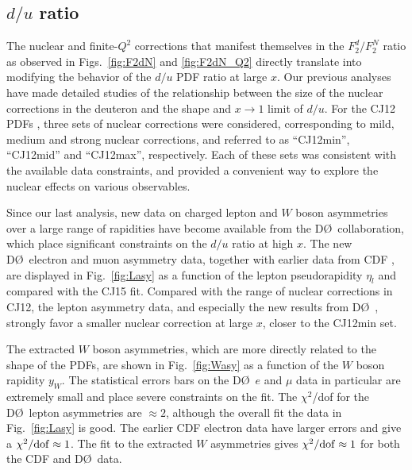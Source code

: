 \documentclass[aps,prd,amsmath,preprint]{revtex4}
\begin{document}
\subsection{$d/u$ ratio}
\label{ssec:du}


The nuclear and finite-$Q^2$ corrections that manifest themselves
in the $F_2^d/F_2^N$ ratio as observed in Figs.~\ref{fig:F2dN} and
\ref{fig:F2dN_Q2} directly translate into modifying the behavior
of the $d/u$ PDF ratio at large $x$.  Our previous analyses
\cite{CJ10, CJ11, CJ12} have made detailed studies of the
relationship between the size of the nuclear corrections in
the deuteron and the shape and $x \to 1$ limit of $d/u$.
For the CJ12 PDFs \cite{CJ12}, three sets of nuclear corrections
were considered, corresponding to mild, medium and strong nuclear
corrections, and referred to as ``CJ12min'', ``CJ12mid'' and
``CJ12max'', respectively.  Each of these sets was consistent
with the available data constraints, and provided a convenient
way to explore the nuclear effects on various observables.


Since our last analysis, new data on charged lepton \cite{D0_mu,
D0_e} and $W$ boson asymmetries \cite{D0_W} over a large range
of rapidities have become available from the D\O\ collaboration,
which place significant constraints on the $d/u$ ratio at high $x$.
The new D\O\ electron and muon asymmetry data, together with earlier
data from CDF \cite{CDF_e}, are displayed in Fig.~\ref{fig:Lasy}
as a function of the lepton pseudorapidity $\eta_l$ and compared
with the CJ15 fit.
Compared with the range of nuclear corrections in CJ12, the
lepton asymmetry data, and especially the new results from
D\O\ \cite{D0_mu, D0_e}, strongly favor a smaller nuclear
correction at large $x$, closer to the CJ12min set.


The extracted $W$ boson asymmetries, which are more directly
related to the shape of the PDFs, are shown in Fig.~\ref{fig:Wasy}
as a function of the $W$ boson rapidity $y_W$.  The statistical
errors bars on the D\O\ $e$ and $\mu$ data in particular are
extremely small and place severe constraints on the fit.
The $\chi^2$/dof for the D\O\ lepton asymmetries are $\approx 2$,
although the overall fit the data in Fig.~\ref{fig:Lasy} is good.
The earlier CDF electron data have larger errors and give a
$\chi^2/{\rm dof} \approx 1$.  The fit to the extracted $W$
asymmetries gives $\chi^2/{\rm dof} \approx 1$ for both the CDF
and D\O\ data.
\end{document}
